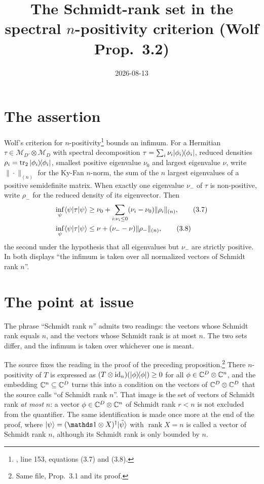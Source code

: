 \documentclass[11pt]{article}
\title{The Schmidt-rank set in the spectral $n$-positivity criterion
  (Wolf Prop.~3.2)}
\author{}
\date{2026-08-13}
\begin{document}
\maketitle
{}

\section{The assertion}

Wolf's criterion for $n$-positivity\footnote{%
  , line 153,
  equations (3.7) and (3.8).}
bounds an infimum. For a Hermitian $\tau\in\mathcal M_{D'}\otimes\mathcal M_{D}$
with spectral decomposition $\tau=\sum_i\nu_i|\phi_i\rangle\!\langle \phi_i|$, reduced
densities $\rho_i=\operatorname{tr}_2|\phi_i\rangle\!\langle \phi_i|$, smallest positive eigenvalue
$\nu_0$ and largest eigenvalue $\nu$, write $\|\cdot\|_{(n)}$ for the Ky-Fan
$n$-norm, the sum of the $n$ largest eigenvalues of a positive semidefinite
matrix. When exactly one eigenvalue $\nu_-$ of $\tau$ is non-positive, write
$\rho_-$ for the reduced density of its eigenvector. Then
\begin{align}
  \inf_\psi\langle \psi|\tau|\psi\rangle
   & \ge \nu_0+\sum_{i:\nu_i\le0}(\nu_i-\nu_0)\|\rho_i\|_{(n)},
  \tag{3.7}                                                       \\
  \inf_\psi\langle \psi|\tau|\psi\rangle
   & \le \nu+(\nu_--\nu)\|\rho_-\|_{(n)},
  \tag{3.8}
\end{align}
the second under the hypothesis that all eigenvalues but $\nu_-$ are strictly
positive. In both displays ``the infimum is taken over all normalized vectors of
Schmidt rank $n$''.

\section{The point at issue}

The phrase ``Schmidt rank $n$'' admits two readings: the vectors whose Schmidt
rank equals $n$, and the vectors whose Schmidt rank is at most $n$. The two sets
differ, and the infimum is taken over whichever one is meant.

The source fixes the reading in the proof of the preceding
proposition.\footnote{Same file, Prop.~3.1 and its proof.} There $n$-positivity
of $T$ is expressed as
$(T\otimes\mathrm{id}_n)(|\phi\rangle\!\langle \phi|)\ge0$ for all
$\phi\in\mathbb{C}^{D}\otimes\mathbb{C}^{n}$, and the embedding $\mathbb{C}^{n}\subseteq\mathbb{C}^{D}$ turns
this into a condition on the vectors of $\mathbb{C}^{D}\otimes\mathbb{C}^{D}$ that the source
calls ``of Schmidt rank $n$''. That image is the set of vectors of Schmidt rank
\emph{at most} $n$: a vector $\phi\in\mathbb{C}^{D}\otimes\mathbb{C}^{n}$ of Schmidt rank $r<n$
is not excluded from the quantifier. The same identification is made once more
at the end of the proof, where $\ket{\psi}=(\one\otimes X)^\dagger\ket{\tilde
\psi}$ with $\operatorname{rank}X=n$ is called a vector of Schmidt rank $n$, although its
Schmidt rank is only bounded by $n$.
\end{document}
